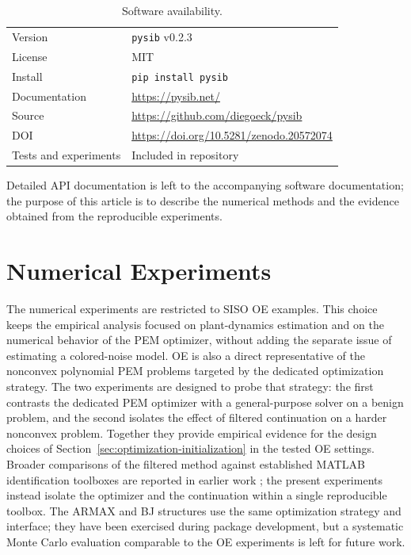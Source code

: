 \documentclass{ifacconf}
\begin{document}
\begin{table}[ht]
  \caption{Software availability.}
  \label{tab:availability}
  \centering
  \footnotesize
  \begin{tabular}{lp{}}
    \toprule
    Version & \texttt{pysib} v0.2.3~\citep{pysib2026} \\
    License & MIT \\
    Install & \texttt{pip install pysib} \\
    Documentation & \url{https://pysib.net/} \\
    Source & \url{https://github.com/diegoeck/pysib} \\
    DOI & \url{https://doi.org/10.5281/zenodo.20572074} \\
    Tests and experiments & Included in repository \\
    \bottomrule
  \end{tabular}
\end{table}

Detailed API documentation is left to the accompanying
software documentation; the purpose of this article is to describe the numerical
methods and the evidence obtained from the reproducible experiments.

\section{Numerical Experiments}
\label{sec:numerical-experiments}

The numerical experiments are restricted to SISO OE examples.  This choice keeps
the empirical analysis focused on plant-dynamics estimation and on the numerical
behavior of the PEM optimizer, without adding the separate issue of estimating a
colored-noise model.  OE is also a direct representative of the nonconvex
polynomial PEM problems targeted by the dedicated optimization strategy.  The two
experiments are designed to probe that strategy: the first contrasts the
dedicated PEM optimizer with a general-purpose solver on a benign problem, and
the second isolates the effect of filtered continuation on a harder nonconvex
problem.  Together they provide empirical evidence for the design choices of
Section~\ref{sec:optimization-initialization} in the tested OE settings.  Broader
comparisons of the filtered method against established MATLAB identification
toolboxes are reported in earlier work \citep{eckhard2013input,eckhard2017cost};
the present experiments instead isolate the optimizer and the continuation within
a single reproducible toolbox.  The
ARMAX and BJ structures use the same optimization strategy and interface;
they have been exercised during package development, but a systematic Monte
Carlo evaluation comparable to the OE experiments is left for future work.
\end{document}
